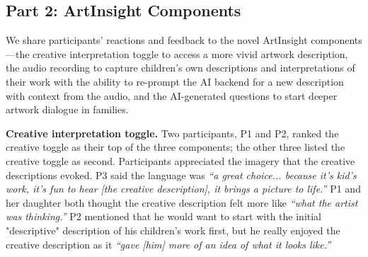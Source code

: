 \documentclass[sigconf]{acmart}
\begin{document}



\subsection{Part 2: ArtInsight Components}
We share participants' reactions and feedback to the novel ArtInsight components---the creative interpretation toggle to access a more vivid artwork description, the audio recording to capture children's own descriptions and interpretations of their work with the ability to re-prompt the AI backend for a new description with context from the audio, and the AI-generated questions to start deeper artwork dialogue in families.

\textbf{Creative interpretation toggle.} Two participants, P1 and P2, ranked the creative toggle as their top of the three components; the other three listed the creative toggle as second. Participants appreciated the imagery that the creative descriptions evoked. P3 said the language was \textit{``a great choice... because it's kid's work, it's fun to hear [the creative description], it brings a picture to life.''} P1 and her daughter both thought the creative description felt more like \textit{``what the artist was thinking.''} P2 mentioned that he would want to start with the initial "descriptive" description of his children's work first, but he really enjoyed the creative description as it \textit{``gave [him] more of an idea of what it looks like.''}
\end{document}
